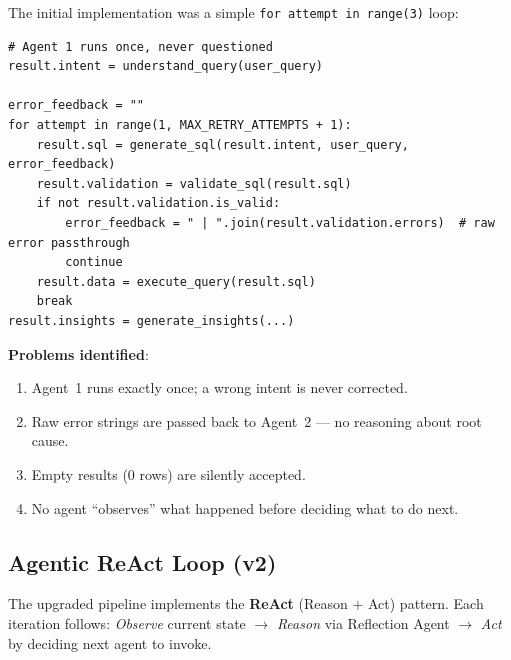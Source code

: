 \documentclass[12pt,a4paper]{report}
\begin{document}
The initial implementation was a simple \texttt{for attempt in range(3)} loop:

\begin{lstlisting}[caption={Original sequential pipeline (non-agentic)}]
# Agent 1 runs once, never questioned
result.intent = understand_query(user_query)

error_feedback = ""
for attempt in range(1, MAX_RETRY_ATTEMPTS + 1):
    result.sql = generate_sql(result.intent, user_query, error_feedback)
    result.validation = validate_sql(result.sql)
    if not result.validation.is_valid:
        error_feedback = " | ".join(result.validation.errors)  # raw error passthrough
        continue
    result.data = execute_query(result.sql)
    break
result.insights = generate_insights(...)
\end{lstlisting}

\textbf{Problems identified}:
\begin{enumerate}
  \item Agent~1 runs exactly once; a wrong intent is never corrected.
  \item Raw error strings are passed back to Agent~2 — no reasoning about root cause.
  \item Empty results (0 rows) are silently accepted.
  \item No agent ``observes'' what happened before deciding what to do next.
\end{enumerate}

\subsection{Agentic ReAct Loop (v2)}

The upgraded pipeline implements the \textbf{ReAct} (Reason + Act) pattern. Each iteration
follows: \emph{Observe} current state $\to$ \emph{Reason} via Reflection Agent $\to$
\emph{Act} by deciding next agent to invoke.
\end{document}
